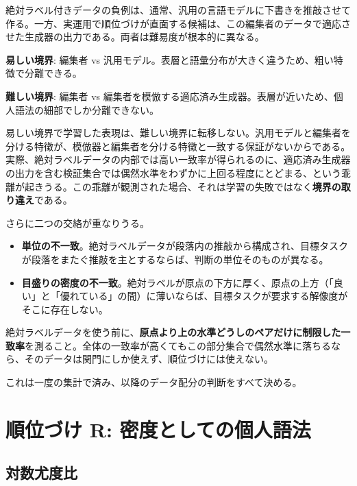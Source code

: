\documentclass[a4paper,10.5pt]{ltjsarticle}
\begin{document}
絶対ラベル付きデータの負例は、通常、汎用の言語モデルに下書きを推敲させて作る。一方、実運用で順位づけが直面する候補は、この編集者のデータで適応させた生成器の出力である。両者は難易度が根本的に異なる。

\begin{keybox}[title=二つの判別問題]
\textbf{易しい境界}: 編集者 vs 汎用モデル。表層と語彙分布が大きく違うため、粗い特徴で分離できる。

\textbf{難しい境界}: 編集者 vs 編集者を模倣する適応済み生成器。表層が近いため、個人語法の細部でしか分離できない。
\end{keybox}

易しい境界で学習した表現は、難しい境界に転移しない。汎用モデルと編集者を分ける特徴が、模倣器と編集者を分ける特徴と一致する保証がないからである。実際、絶対ラベルデータの内部では高い一致率が得られるのに、適応済み生成器の出力を含む検証集合では偶然水準をわずかに上回る程度にとどまる、という乖離が起きうる。この乖離が観測された場合、それは学習の失敗ではなく\textbf{境界の取り違え}である。

さらに二つの交絡が重なりうる。

\begin{itemize}
  \item \textbf{単位の不一致}。絶対ラベルデータが段落内の推敲から構成され、目標タスクが段落をまたぐ推敲を主とするならば、判断の単位そのものが異なる。
  \item \textbf{目盛りの密度の不一致}。絶対ラベルが原点の下方に厚く、原点の上方（「良い」と「優れている」の間）に薄いならば、目標タスクが要求する解像度がそこに存在しない。
\end{itemize}

\begin{warnbox}[title=必須の診断]
絶対ラベルデータを使う前に、\textbf{原点より上の水準どうしのペアだけに制限した一致率}を測ること。全体の一致率が高くてもこの部分集合で偶然水準に落ちるなら、そのデータは関門にしか使えず、順位づけには使えない。

これは一度の集計で済み、以降のデータ配分の判断をすべて決める。
\end{warnbox}

\section{順位づけ R: 密度としての個人語法}

\subsection{対数尤度比}
\end{document}

